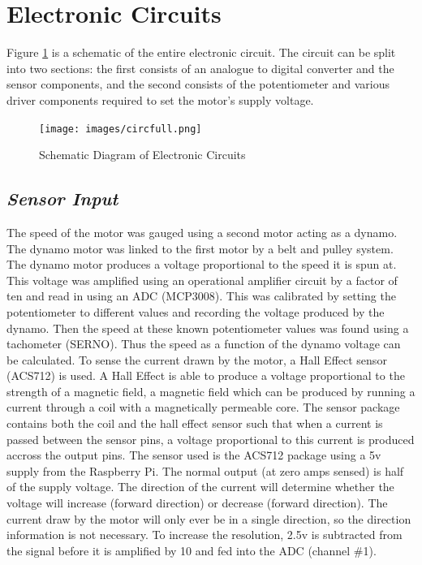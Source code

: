 \documentclass[twoside,a4]{report}
\def\br{\newline \newline \noindent}
\begin{document}
	\section{Electronic Circuits} %
	Figure \ref{circfull} is a schematic of the entire electronic circuit. The circuit can be split into two sections: the first consists of an analogue to digital converter and the sensor components, and the second consists of the potentiometer and various driver components required to set the motor's supply voltage.
	\begin{figure}[!htb]
		\centering
		\texttt{[image: images/circfull.png]}
		\caption{Schematic Diagram of Electronic Circuits}
		\label{circfull}
	\end{figure}

	\subsection*{\textit{Sensor Input}} %
	The speed of the motor was gauged using a second motor acting as a dynamo. The dynamo motor was linked to the first motor by a belt and pulley system. The dynamo motor produces a voltage proportional to the speed it is spun at. This voltage was amplified using an operational amplifier circuit by a factor of ten and read in using an ADC (MCP3008). This was calibrated by setting the potentiometer to different values and recording the voltage produced by the dynamo. Then the speed at these known potentiometer values was found using a tachometer (SERNO). Thus the speed as a function of the dynamo voltage can be calculated. \br
	To sense the current drawn by the motor, a Hall Effect sensor (ACS712) is used. A Hall Effect is able to produce a voltage proportional to the strength of a magnetic field, a magnetic field which can be produced by running a current through a coil with a magnetically permeable core. The sensor package contains both the coil and the hall effect sensor such that when a current is passed between the sensor pins, a voltage proportional to this current is produced accross the output pins. The sensor used is the ACS712 package using a 5v supply from the Raspberry Pi. The normal output (at zero amps sensed) is half of the supply voltage. The direction of the current will determine whether the voltage will increase (forward direction) or decrease (forward direction). 
	\br
	The current draw by the motor will only ever be in a single direction, so the direction information is not necessary. To increase the resolution, 2.5v is subtracted from the signal before it is amplified by 10 and fed into the ADC (channel \#1). 
	
\end{document}
